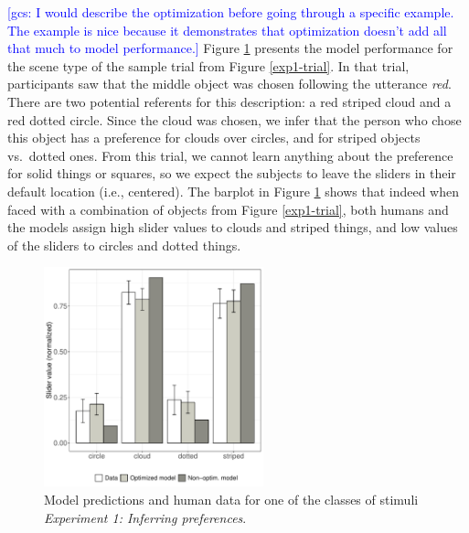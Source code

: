 \documentclass[10pt,a4paper]{article}
\newcommand{\gcs}[1]{\textcolor{blue}{[gcs: #1]}}
\begin{document}
\gcs{I would describe the optimization before going through a specific example. The example is nice because it demonstrates that optimization doesn't add all that much to model performance.} Figure \ref{barplot_x4} presents the model performance for the scene type of the sample trial from Figure \ref{exp1-trial}. In that trial, participants saw that the middle object was chosen following the utterance \textit{red}. There are two potential referents for this description: a red striped cloud and a red dotted circle. Since the cloud was chosen, we infer that the person who chose this object has a preference for clouds over circles, and for striped objects vs.~dotted ones. From this trial, we cannot learn anything about the preference for solid things or squares, so we expect the subjects to leave the sliders in their default location (i.e., centered).
The barplot in Figure \ref{barplot_x4} shows that indeed when faced with a combination of objects from Figure \ref{exp1-trial}, both humans and the models assign high slider values to clouds and striped things, and low values of the sliders to circles and dotted things. 

\begin{figure}[ht!]
	\centering
	\includegraphics[width=2.5in]{images/barplot_x4.pdf}
	\caption{Model predictions and human data for one of the classes of stimuli \emph{Experiment 1: Inferring preferences}.}\label{barplot_x4}
\end{figure}
\end{document}

